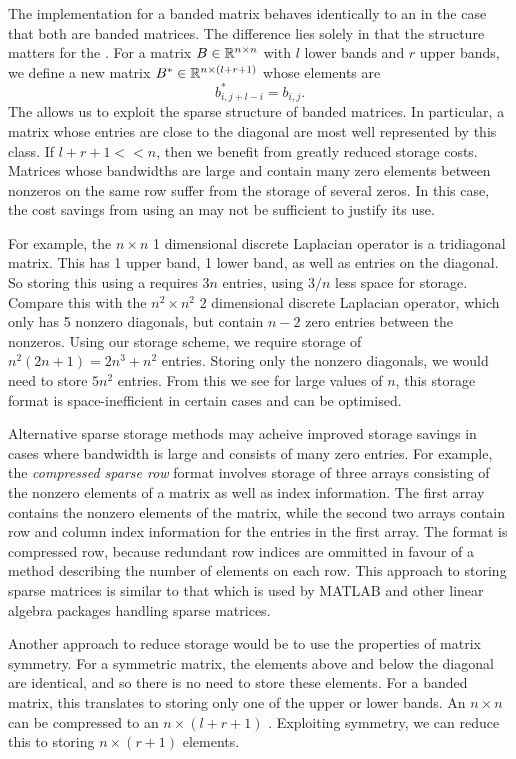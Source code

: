 The  implementation for a banded matrix behaves identically to an  in the case that both are banded matrices.
The difference lies solely in that the structure matters for the .
For a matrix $B\in\mathbb{R}^{n\times n}$ with $l$ lower bands and $r$ upper bands, we define a new matrix $B^*\in\mathbb{R}^{n \times (l+r+1)}$ whose elements are
\[
    b^*_{i,j+l-i} = b_{i,j}.
\]
The  allows us to exploit the sparse structure of banded matrices.
In particular, a matrix whose entries are close to the diagonal are most well represented by this class. 
If $l+r+1 << n$, then we benefit from greatly reduced storage costs.
Matrices whose bandwidths are large and contain many zero elements between nonzeros on the same row suffer from the storage of several zeros.
In this case, the cost savings from using an  may not be sufficient to justify its use.

For example, the $n\times n$ 1 dimensional discrete Laplacian operator is a tridiagonal matrix. 
This has 1 upper band, 1 lower band, as well as entries on the diagonal.
So storing this using a  requires $3n$ entries, using $3/n$ less space for storage.
Compare this with the $n^2\times n^2$ 2 dimensional discrete Laplacian operator, which only has 5 nonzero diagonals, but contain $n-2$ zero entries between the nonzeros.
Using our storage scheme, we require storage of $n^2(2n+1)=2n^3+n^2$ entries. 
Storing only the nonzero diagonals, we would need to store $5n^2$ entries.
From this we see for large values of $n$, this storage format is space-inefficient in certain cases and can be optimised.

Alternative sparse storage methods may acheive improved storage savings in cases where bandwidth is large and consists of many zero entries.
For example, the \textit{compressed sparse row} format involves storage of three arrays consisting of the nonzero elements of a matrix as well as index information.
The first array contains the nonzero elements of the matrix, while the second two arrays contain row and column index information for the entries in the first array.
The format is compressed row, because redundant row indices are ommitted in favour of a method describing the number of elements on each row.
This approach to storing sparse matrices is similar to that which is used by MATLAB and other linear algebra packages handling sparse matrices.

Another approach to reduce storage would be to use the properties of matrix symmetry. 
For a symmetric matrix, the elements above and below the diagonal are identical, and so there is no need to store these elements.
For a banded matrix, this translates to storing only one of the upper or lower bands.
An $n\times n$  can be compressed to an $n \times (l+r+1)$ .
Exploiting symmetry, we can reduce this to storing $n \times (r+1)$ elements.


